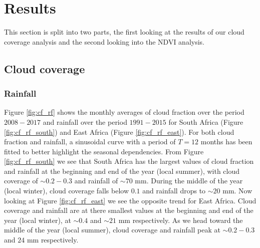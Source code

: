\section{Results}
This section is split into two parts, the first looking at the results
of our cloud coverage analysis and the second looking into the NDVI
analysis.
\subsection{Cloud coverage}
\subsubsection{Rainfall}
Figure \ref{fig:cf_rf} shows the monthly averages of cloud fraction over the
period $2008-2017$ and rainfall over the period $1991-2015$ for South Africa
(Figure \ref{fig:cf_rf_south}) and East Africa (Figure
\ref{fig:cf_rf_east}). For both cloud fraction and rainfall, a sinusoidal curve
with a period of $T=12$ months has been fitted to better highlight the seasonal
dependencies. From Figure \ref{fig:cf_rf_south} we see that South Africa has the
largest values of cloud fraction and rainfall at the beginning and end of the
year (local summer), with cloud coverage of ${\sim}0.2-0.3$ and rainfall of
${\sim}70$ mm. During the middle of the year (local winter), cloud coverage falls
below $0.1$ and rainfall drops to ${\sim}20$ mm. Now looking at Figure
\ref{fig:cf_rf_east} we see the opposite trend for East Africa. Cloud coverage
and rainfall are at there smallest values at the beginning and end of the year
(local winter), at ${\sim}0.4$ and ${\sim}21$ mm respectively. As we head toward the
middle of the year (local summer), cloud coverage and rainfall peak at
${\sim}0.2-0.3$ and $24$ mm respectively.
